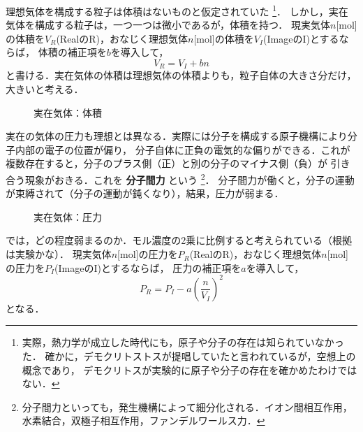        理想気体を構成する粒子は体積はないものと仮定されていた
            \footnote{
                実際，熱力学が成立した時代にも，原子や分子の存在は知られていなかった．
                確かに，デモクリトストスが提唱していたと言われているが，空想上の概念であり，
                デモクリトスが実験的に原子や分子の存在を確かめたわけではない．
            }．
        しかし，実在気体を構成する粒子は，一つ一つは微小であるが，体積を持つ．
        現実気体$n$[mol]の体積を${V}_{R}$(RealのR)，おなじく理想気体$n$[mol]の体積を${V}_{I}$(ImageのI)とするならば，
        体積の補正項を$b$を導入して，
            \begin{equation}
                {V}_{R} = {V}_{I} + bn
            \end{equation}
        と書ける．実在気体の体積は理想気体の体積よりも，粒子自体の大きさ分だけ，大きいと考える．
        \begin{figure}[hbt]
            \begin{center}
                \caption{実在気体：体積}
                \label{fig:netsurikigaku_van_der_waals_force}
            \end{center}
        \end{figure}

        実在の気体の圧力も理想とは異なる．実際には分子を構成する原子機構により分子内部の電子の位置が偏り，
        分子自体に正負の電気的な偏りができる．これが複数存在すると，分子のプラス側（正）と別の分子のマイナス側（負）が
        引き合う現象がおきる．これを \textbf{分子間力} という
            \footnote{
                分子間力といっても，発生機構によって細分化される．イオン間相互作用，水素結合，双極子相互作用，ファンデルワールス力．
            }．
        分子間力が働くと，分子の運動が束縛されて（分子の運動が鈍くなり），結果，圧力が弱まる．
        \begin{figure}[hbt]
            \begin{center}
                \caption{実在気体：圧力}
                \label{fig:netsurikigaku_van_der_waals_force2}
            \end{center}
        \end{figure}
        では，どの程度弱まるのか．モル濃度の2乗に比例すると考えられている（根拠は実験かな）．
        現実気体$n$[mol]の圧力を${P}_{R}$(RealのR)，おなじく理想気体$n$[mol]の圧力を${P}_{I}$(ImageのI)とするならば，
        圧力の補正項を$a$を導入して，
        \begin{equation}
            {P}_{R} = {P}_{I} - a{\left( \frac{n}{{V}_{I}} \right)}^{2}
        \end{equation}
        となる．

